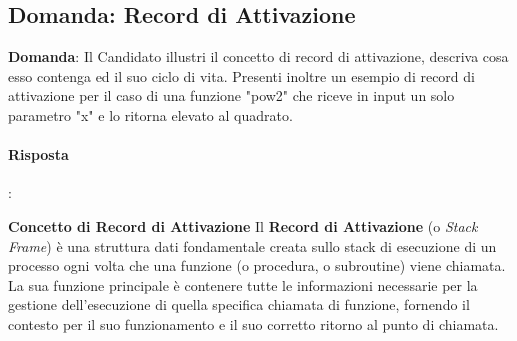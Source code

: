 
\subsection*{Domanda: Record di Attivazione}

\textbf{Domanda}: Il Candidato illustri il concetto di record di attivazione, descriva cosa esso contenga ed il suo ciclo di vita. Presenti inoltre un esempio di record di attivazione per il caso di una funzione "pow2" che riceve in input un solo parametro "x" e lo ritorna elevato al quadrato.

\paragraph{Risposta}:

\textbf{Concetto di Record di Attivazione}
Il \textbf{Record di Attivazione} (o \textit{Stack Frame}) è una struttura dati fondamentale creata sullo stack di esecuzione di un processo ogni volta che una funzione (o procedura, o subroutine) viene chiamata. La sua funzione principale è contenere tutte le informazioni necessarie per la gestione dell'esecuzione di quella specifica chiamata di funzione, fornendo il contesto per il suo funzionamento e il suo corretto ritorno al punto di chiamata.

